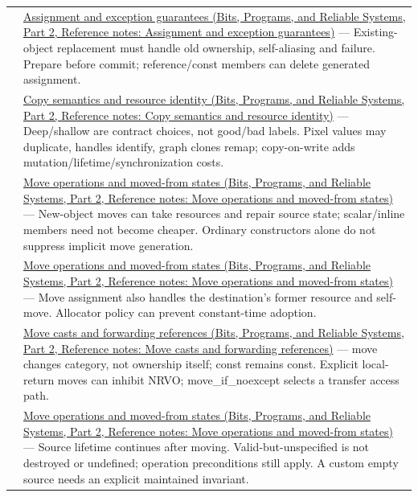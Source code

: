 {\begin{longtable}[]{@{}
  >{\raggedright\arraybackslash}p{}
  >{\raggedright\arraybackslash}p{}@{}}
138 & \href{../01-Bits-Programs-and-Reliable-Systems-P02/main.pdf\#appendix-bea6beb5350f}{Assignment and exception guarantees (Bits, Programs, and Reliable Systems, Part 2, Reference notes: Assignment and exception guarantees)} --- Existing-object replacement must handle old ownership, self-aliasing and failure. Prepare before commit; reference/const members can delete generated assignment. \\
139 & \href{../01-Bits-Programs-and-Reliable-Systems-P02/main.pdf\#appendix-1340cd1ce582}{Copy semantics and resource identity (Bits, Programs, and Reliable Systems, Part 2, Reference notes: Copy semantics and resource identity)} --- Deep/shallow are contract choices, not good/bad labels. Pixel values may duplicate, handles identify, graph clones remap; copy-on-write adds mutation/lifetime/synchronization costs. \\
140 & \href{../01-Bits-Programs-and-Reliable-Systems-P02/main.pdf\#appendix-5636651017c2}{Move operations and moved-from states (Bits, Programs, and Reliable Systems, Part 2, Reference notes: Move operations and moved-from states)} --- New-object moves can take resources and repair source state; scalar/inline members need not become cheaper. Ordinary constructors alone do not suppress implicit move generation. \\
141 & \href{../01-Bits-Programs-and-Reliable-Systems-P02/main.pdf\#appendix-5636651017c2}{Move operations and moved-from states (Bits, Programs, and Reliable Systems, Part 2, Reference notes: Move operations and moved-from states)} --- Move assignment also handles the destination's former resource and self-move. Allocator policy can prevent constant-time adoption. \\
142 & \href{../01-Bits-Programs-and-Reliable-Systems-P02/main.pdf\#appendix-0104b704fb11}{Move casts and forwarding references (Bits, Programs, and Reliable Systems, Part 2, Reference notes: Move casts and forwarding references)} --- move changes category, not ownership itself; const remains const. Explicit local-return moves can inhibit NRVO; move\_if\_noexcept selects a transfer access path. \\
143 & \href{../01-Bits-Programs-and-Reliable-Systems-P02/main.pdf\#appendix-5636651017c2}{Move operations and moved-from states (Bits, Programs, and Reliable Systems, Part 2, Reference notes: Move operations and moved-from states)} --- Source lifetime continues after moving. Valid-but-unspecified is not destroyed or undefined; operation preconditions still apply. A custom empty source needs an explicit maintained invariant. \\

\end{longtable}}
